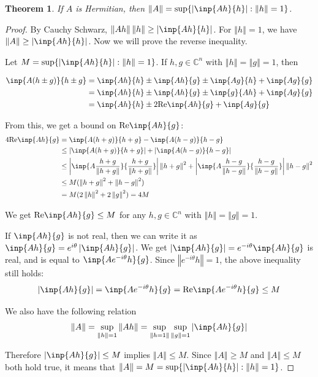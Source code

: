 \documentclass[twoside]{article}
\newcommand*\norm[1]{\left \Vert #1 \right\Vert}
\newcommand*\abs[1]{\left \vert #1 \right\vert}
\theoremstyle{plain}
\newtheorem{theorem}{Theorem}
\theoremstyle{definition}
\theoremstyle{remark}
\begin{document}
\begin{theorem}\label{norm_herm} If \(A\) is Hermitian, then \(\norm{A} = \sup\{\abs{\inp{Ah}{h}} : \norm{h} = 1\}\).\end{theorem}
\begin{proof} By Cauchy Schwarz, \(\norm{Ah}\norm{h} \ge \abs{\inp{Ah}{h}}\). For \(\norm{h} =1\), we have  \(\norm{A} \ge \abs{\inp{Ah}{h}}\). Now we will prove the reverse inequality. 

Let \(M = \sup \{\abs{\inp{Ah}{h}} : \norm{h} = 1 \}\). If \(h, g \in \mathbb{C}^n\) with \(\norm{h} = \norm{g} = 1\), then

\begin{equation*} \begin{split}
\inp{A (h \pm g)}{h\pm g} & = \inp{Ah}{h} \pm \inp{Ah}{g} \pm \inp{Ag}{h} + \inp{Ag}{g} \\
& = \inp{Ah}{h} \pm \inp{Ah}{g} \pm \inp{g}{Ah} + \inp{Ag}{g} \\
& = \inp{Ah}{h} \pm 2 \text{Re}\inp{Ah}{g} + \inp{Ag}{g} \\
\end{split} \end{equation*}

From this, we get a bound on \(\mathrm{Re}\inp{Ah}{g}\):
\begin{equation*} \begin{split}
4\mathrm{Re} \inp{Ah}{g} &= \inp{A(h+g)}{h+g} - \inp{A(h-g)}{h-g} \\
& \le \abs{\inp{A(h+g)}{h+g}} + \abs{\inp{A(h-g)}{h-g}} \\
& \le \abs{\inp{A \frac{h+g}{\norm{h+g}}}{\frac{h+g}{\norm{h+g}}}} \norm{h + g}^2 + \abs{\inp{A \frac{h-g}{\norm{h-g}}}{\frac{h-g}{\norm{h-g}}}} \norm{h - g}^2\\
& \le M (\norm{h + g}^2 + \norm{h-g}^2) \\
& = M (2 \norm{h}^2 + 2 \norm{g}^2) = 4M 
\end{split} \end{equation*}


We get \(\text{Re} \inp{Ah}{g} \le M\) for any \(h, g \in \mathbb{C}^n\) with \(\norm{h} = \norm{g} = 1\). 

If \(\inp{Ah}{g}\) is not real, then we can write it as  \(\inp{Ah}{g} = e^{i \theta} \abs{\inp{Ah}{g}}\). We get \(\abs{\inp{Ah}{g}} = e^{-i \theta} \inp{Ah}{g}\) is real, and is equal to \(\inp{A e^{- i\theta}h}{g}\). Since \(\norm{e^{-i\theta} h}= 1\), the above inequality still holds:
 \[\abs{\inp{Ah}{g}} = \inp{Ae^{-i\theta}h}{g} =  \text{Re} \inp{Ae^{-i\theta}h}{g} \le M\]

We also have the following relation
 \[\norm{A} = \sup_{\norm{h} =1} \norm{Ah} = \sup_{\norm{h = 1}} \sup_{\norm{g} = 1} \abs{\inp{Ah}{g}} \]

Therefore \(\abs{\inp{Ah}{g}} \le M\)  implies \(\norm{A} \le M\). Since \(\norm{A} \ge M\) and \(\norm{A} \le M\) both hold true, it means that \(\norm{A} = M = \sup \{ \abs{\inp{Ah}{h}} : \norm{h} = 1 \}\).
\end{proof}
\end{document}
